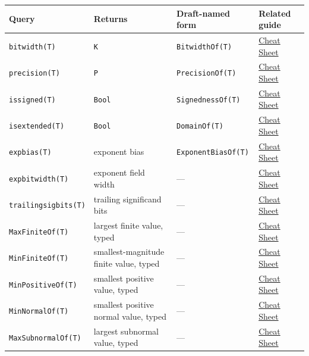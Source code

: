 \begin{table}[h]
\centering
\begin{tabulary}{\linewidth}{L L L L}
\toprule
Query & Returns & Draft-named form & Related guide \\
\toprule
\texttt{bitwidth(T)} & \texttt{K} & \texttt{BitwidthOf(T)} & \href{help\_\allowbreak{}cheat\_\allowbreak{}sheet.md}{Cheat Sheet} \\
\texttt{precision(T)} & \texttt{P} & \texttt{PrecisionOf(T)} & \href{help\_\allowbreak{}cheat\_\allowbreak{}sheet.md}{Cheat Sheet} \\
\texttt{issigned(T)} & \texttt{Bool} & \texttt{SignednessOf(T)} & \href{help\_\allowbreak{}cheat\_\allowbreak{}sheet.md}{Cheat Sheet} \\
\texttt{isextended(T)} & \texttt{Bool} & \texttt{DomainOf(T)} & \href{help\_\allowbreak{}cheat\_\allowbreak{}sheet.md}{Cheat Sheet} \\
\texttt{expbias(T)} & exponent bias & \texttt{ExponentBiasOf(T)} & \href{help\_\allowbreak{}cheat\_\allowbreak{}sheet.md}{Cheat Sheet} \\
\texttt{expbitwidth(T)} & exponent field width & — & \href{help\_\allowbreak{}cheat\_\allowbreak{}sheet.md}{Cheat Sheet} \\
\texttt{trailingsigbits(T)} & trailing significand bits & — & \href{help\_\allowbreak{}cheat\_\allowbreak{}sheet.md}{Cheat Sheet} \\
\texttt{MaxFiniteOf(T)} & largest finite value, typed & — & \href{help\_\allowbreak{}cheat\_\allowbreak{}sheet.md}{Cheat Sheet} \\
\texttt{MinFiniteOf(T)} & smallest-magnitude finite value, typed & — & \href{help\_\allowbreak{}cheat\_\allowbreak{}sheet.md}{Cheat Sheet} \\
\texttt{MinPositiveOf(T)} & smallest positive value, typed & — & \href{help\_\allowbreak{}cheat\_\allowbreak{}sheet.md}{Cheat Sheet} \\
\texttt{MinNormalOf(T)} & smallest positive normal value, typed & — & \href{help\_\allowbreak{}cheat\_\allowbreak{}sheet.md}{Cheat Sheet} \\
\texttt{MaxSubnormalOf(T)} & largest subnormal value, typed & — & \href{help\_\allowbreak{}cheat\_\allowbreak{}sheet.md}{Cheat Sheet} \\
\bottomrule
\end{tabulary}

\end{table}



